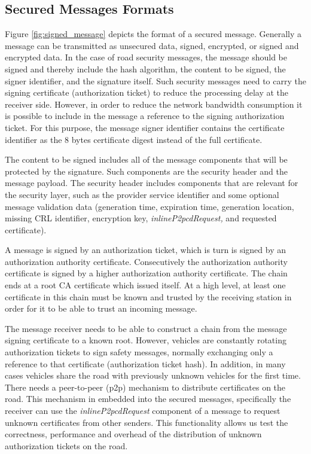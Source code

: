 \subsection{Secured Messages Formats}
Figure \ref{fig:signed_message} depicts the format of a secured message. Generally a message can be transmitted as unsecured data, signed, encrypted, or signed and encrypted data. In the case of road security messages, the message should be signed and thereby include the hash algorithm, the content to be signed, the signer identifier, and the signature itself. Such security messages need to carry the signing certificate (authorization ticket) to reduce the processing delay at the receiver side. However, in order to reduce the network bandwidth consumption it is possible to include in the message a reference to the signing authorization ticket. For this purpose, the message signer identifier contains the certificate identifier as the 8 bytes certificate digest instead of the full certificate. 

The content to be signed includes all of the message components that will be protected by the signature. Such components are the security header and the message payload. The security header includes components that are relevant for the security layer, such as the provider service identifier and some optional message validation data (generation time, expiration time, generation location, missing CRL identifier, encryption key, \textit{inlineP2pcdRequest,} and requested certificate).



A message is signed by an authorization ticket, which is turn is signed by an authorization authority certificate. Consecutively the authorization authority certificate is signed by a higher authorization authority certificate. The chain ends at a root CA certificate which issued itself. At a high level, at least one certificate in this chain must be known and trusted by the receiving station in order for it to be able to trust an incoming message.

The message receiver needs to be able to construct a chain from the message signing certificate to a known root. However, vehicles are constantly rotating authorization tickets to sign safety messages, normally exchanging only a reference to that certificate (authorization ticket hash). In addition, in many cases vehicles share the road with previously unknown vehicles for the first time. There needs a peer-to-peer (p2p) mechanism to distribute certificates on the road. This mechanism in embedded into the secured messages, specifically the receiver can use the \textit{inlineP2pcdRequest} component of a message to request unknown certificates from other senders. This functionality allows us test the correctness, performance and overhead of the distribution of unknown authorization tickets on the road.

